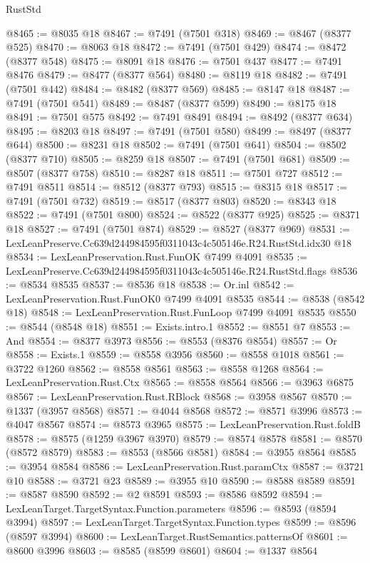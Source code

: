 \begin{lexlean}{RustStd}
\begin{coremodule}
@8465 := @8035 @18
@8467 := @7491 (@7501 @318)
@8469 := @8467 (@8377 @525)
@8470 := @8063 @18
@8472 := @7491 (@7501 @429)
@8474 := @8472 (@8377 @548)
@8475 := @8091 @18
@8476 := @7501 @437
@8477 := @7491 @8476
@8479 := @8477 (@8377 @564)
@8480 := @8119 @18
@8482 := @7491 (@7501 @442)
@8484 := @8482 (@8377 @569)
@8485 := @8147 @18
@8487 := @7491 (@7501 @541)
@8489 := @8487 (@8377 @599)
@8490 := @8175 @18
@8491 := @7501 @575
@8492 := @7491 @8491
@8494 := @8492 (@8377 @634)
@8495 := @8203 @18
@8497 := @7491 (@7501 @580)
@8499 := @8497 (@8377 @644)
@8500 := @8231 @18
@8502 := @7491 (@7501 @641)
@8504 := @8502 (@8377 @710)
@8505 := @8259 @18
@8507 := @7491 (@7501 @681)
@8509 := @8507 (@8377 @758)
@8510 := @8287 @18
@8511 := @7501 @727
@8512 := @7491 @8511
@8514 := @8512 (@8377 @793)
@8515 := @8315 @18
@8517 := @7491 (@7501 @732)
@8519 := @8517 (@8377 @803)
@8520 := @8343 @18
@8522 := @7491 (@7501 @800)
@8524 := @8522 (@8377 @925)
@8525 := @8371 @18
@8527 := @7491 (@7501 @874)
@8529 := @8527 (@8377 @969)
@8531 := LexLeanPreserve.Cc639d244984595f0311043c4c505146e.R24.RustStd.idx30 @18
@8534 := LexLeanPreservation.Rust.FunOK @7499 @4091
@8535 := LexLeanPreserve.Cc639d244984595f0311043c4c505146e.R24.RustStd.flags
@8536 := @8534 @8535
@8537 := @8536 @18
@8538 := Or.inl
@8542 := LexLeanPreservation.Rust.FunOK0 @7499 @4091 @8535
@8544 := @8538 (@8542 @18)
@8548 := LexLeanPreservation.Rust.FunLoop @7499 @4091 @8535
@8550 := @8544 (@8548 @18)
@8551 := Exists.intro.{1}
@8552 := @8551 @7
@8553 := And
@8554 := @8377 @3973
@8556 := @8553 (@8376 @8554)
@8557 := Or
@8558 := Exists.{1}
@8559 := @8558 @3956
@8560 := @8558 @1018
@8561 := @3722 @1260
@8562 := @8558 @8561
@8563 := @8558 @1268
@8564 := LexLeanPreservation.Rust.Ctx
@8565 := @8558 @8564
@8566 := @3963 @6875
@8567 := LexLeanPreservation.Rust.RBlock
@8568 := @3958 @8567
@8570 := @1337 (@3957 @8568)
@8571 := @4044 @8568
@8572 := @8571 @3996
@8573 := @4047 @8567
@8574 := @8573 @3965
@8575 := LexLeanPreservation.Rust.foldB
@8578 := @8575 (@1259 @3967 @3970)
@8579 := @8574 @8578
@8581 := @8570 (@8572 @8579)
@8583 := @8553 (@8566 @8581)
@8584 := @3955 @8564
@8585 := @3954 @8584
@8586 := LexLeanPreservation.Rust.paramCtx
@8587 := @3721 @10
@8588 := @3721 @23
@8589 := @3955 @10
@8590 := @8588 @8589
@8591 := @8587 @8590
@8592 := @2 @8591
@8593 := @8586 @8592
@8594 := LexLeanTarget.TargetSyntax.Function.parameters
@8596 := @8593 (@8594 @3994)
@8597 := LexLeanTarget.TargetSyntax.Function.types
@8599 := @8596 (@8597 @3994)
@8600 := LexLeanTarget.RustSemantics.patternsOf
@8601 := @8600 @3996
@8603 := @8585 (@8599 @8601)
@8604 := @1337 @8564

\end{coremodule}
\end{lexlean}
